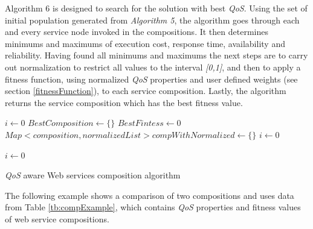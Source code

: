 Algorithm 6 is designed to search for the solution with best \emph{QoS}. Using the set of initial population generated from \emph{Algorithm 5}, the algorithm goes through each and every service node invoked in the compositions. It then determines minimums and maximums of execution cost, response time, availability and reliability. Having found all minimums and maximums the next steps are to carry out normalization to restrict all values to the interval \emph{[0,1]}, and then to apply a fitness function, using normalized \emph{QoS} properties and user defined weights (see section \ref{fitnessFunction}), to each service composition. Lastly, the algorithm returns the service composition which has the best fitness value. \par
\begin{algorithm}[h]

 \LinesNumbered
 \SetNlSty{}{}{:}
  $i \leftarrow 0$\;
 $BestComposition \leftarrow \{\}$\;
 $BestFintess \leftarrow 0$\; 
 $Map<composition, normalizedList> compWithNormalized \leftarrow \{\}$\;
  $i \leftarrow 0$\;

  $i \leftarrow 0$\;
 \caption{\footnotesize \emph{QoS} aware Web services composition algorithm}
\label{generation}
\end{algorithm}

The following example shows a comparison of two compositions and uses data from Table \ref{tb:compExample}, which contains \emph{QoS} properties and fitness values of web service compositions.

